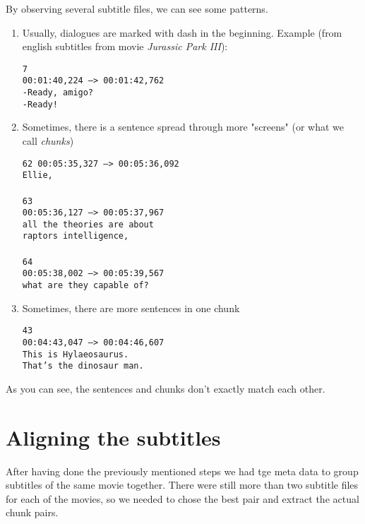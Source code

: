 By observing several subtitle files, we can see some patterns. 

\begin{enumerate}
    \item Usually, dialogues are marked with dash in the beginning. Example (from english subtitles from movie \emph{Jurassic Park III}):
    
        \texttt{7 \\
        00:01:40,224 --> 00:01:42,762 \\
        -Ready, amigo? \\
        -Ready!}
        
    \item Sometimes, there is a sentence spread through more "screens" (or what we call \emph{chunks})
    
    \texttt{62
    00:05:35,327 --> 00:05:36,092\\
    Ellie,\\
\\
    63\\
    00:05:36,127 --> 00:05:37,967\\
    all the theories are about\\
    raptors intelligence,\\
\\
    64\\
    00:05:38,002 --> 00:05:39,567\\
    what are they capable of?}
    
    \item Sometimes, there are more sentences in one chunk
    
    \texttt{43\\
    00:04:43,047 --> 00:04:46,607\\
    This is Hylaeosaurus.\\
    That's the dinosaur man.}
    
\end{enumerate}

As you can see, the sentences and chunks don't exactly match each other.

\section{Aligning the subtitles}
\label{sec:aligning_subtitles}

After having done the previously mentioned steps we had tge meta data to group subtitles of the same movie together. There were still more than two subtitle files for each of the movies, so we needed to chose the best pair and extract the actual chunk pairs.

